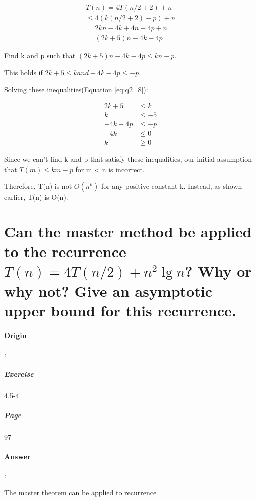 \documentclass{article}
\begin{document}
  \begin{equation}
    \begin{aligned}
      T(n) = 4T(n/2 + 2) + n \\
        \leq  4(k(n/2 + 2) - p) + n \\
        = 2kn - 4k + 4n - 4p + n \\
        = (2k + 5)n - 4k - 4p
    \end{aligned}
    \label{eq:q2_7}
  \end{equation}

  Find k and p such that $(2k + 5)n - 4k - 4p \leq  kn - p$.
  
  This holds if $2k + 5 \leq k and -4k - 4p \leq -p$.
  
  Solving these inequalities(Equation \eqref{eq:q2_8}):

  \begin{equation}
    \begin{aligned}
      2k + 5 &\leq k \\
      k &\leq -5 \\
      -4k - 4p &\leq -p \\
      -4k &\leq 0\\
      k &\geq  0
    \end{aligned}
    \label{eq:q2_8}
  \end{equation}

  Since we can't find k and p that satisfy these inequalities, our initial assumption that $ T(m) \leq km - p$ for m < n is incorrect.

  Therefore, T(n) is not $O(n^k)$ for any positive constant k. Instead, as shown earlier, T(n) is O(n).
  
  \section{Can the master method be applied to the recurrence $ T(n) = 4T(n/2) + n^2 \lg n $? Why or why not? Give an asymptotic upper bound for this recurrence.}

  \paragraph{Origin}:
    \subparagraph{Exercise}4.5-4
    \subparagraph{Page}97
  \paragraph{Answer}:

  The master theorem can be applied to recurrence
\end{document}
